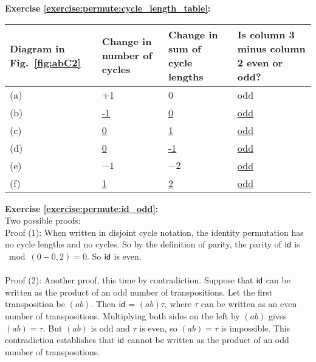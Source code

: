 \noindent\textbf{Exercise  \ref{exercise:permute:cycle_length_table}:}
\begin{table}[!htb]
\begin{tabular}{|p{1.6cm}|p{2.7cm}|p{2.7cm}|p{3.5cm}|}
\hline 
\rule{0pt}{2.6ex} Diagram in Fig.~\ref{fig:abC2}&  Change in number of cycles   & Change in sum of cycle lengths & Is column 3 minus column 2 even or odd?  \rule[-1.2ex]{0pt}{0pt} \tabularnewline
\hline
\hline 
\rule{0pt}{2.6ex} (a)  &  +1  & 0  & odd \rule[-1.2ex]{0pt}{0pt} \tabularnewline
\hline 
\rule{0pt}{2.6ex} (b)  &  \underline{-1} & \underline{0} & \underline{odd} \rule[-1.2ex]{0pt}{0pt} \tabularnewline
\hline 
\rule{0pt}{2.6ex} (c)  &  \underline{0} & \underline{1}  & \underline{odd} \rule[-1.2ex]{0pt}{0pt} \tabularnewline
\hline 
\rule{0pt}{2.6ex} (d)  &  \underline{0} & \underline{-1}  & \underline{odd} \rule[-1.2ex]{0pt}{0pt} \tabularnewline
\hline 
\rule{0pt}{2.6ex} (e)  & $-1$ & $-2$ & \underline{odd} \rule[-1.2ex]{0pt}{0pt} \tabularnewline
\hline 
\rule{0pt}{2.6ex} (f)  &  \underline{1} & \underline{2} & \underline{odd}  \rule[-1.2ex]{0pt}{0pt} \tabularnewline
\hline 
\end{tabular}
\end{table}

\noindent\textbf{Exercise  \ref{exercise:permute:id_odd}:}\\
Two possible proofs:
\\
Proof (1): When written in disjoint cycle notation, the identity permutation has no cycle lengths and no cycles.  So by the definition of parity, the parity of  $\sf{id}$ is $\bmod(0-0,2) = 0$.  So $\sf{id}$ is even.\\
\\
Proof (2): Another proof, this time by contradiction.  Suppose that $\sf{id}$ can be written as the product of an odd number of transpositions.  Let the first transposition be $(ab)$.  Then $\sf{id}$ = $(ab)\tau$, where $\tau$ can be written as an even number of transpositions.  Multiplying both sides on the left by $(ab)$ gives $(ab) = \tau$.  But $(ab)$ is odd and $\tau$ is even, so $(ab)=\tau$ is impossible. This contradiction establishes that $\sf{id}$ cannot be written as the product of an odd number of transpositions.\\
\\

